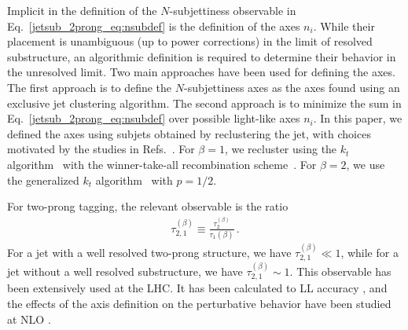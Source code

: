 \documentclass[11pt]{cernrep}
\begin{document}
Implicit in the definition of the $N$-subjettiness observable in
Eq.~\ref{jetsub_2prong_eq:nsubdef} is the definition of the axes $n_i$.
%
While their
placement is unambiguous (up to power corrections) in the limit of resolved substructure, an algorithmic definition is required to
determine their behavior in the unresolved limit.
%
Two main approaches
have been used for defining the axes.
%
The first approach is to define
the $N$-subjettiness axes as the axes found using an exclusive jet
clustering algorithm. The second approach is to minimize the sum in
Eq.~\ref{jetsub_2prong_eq:nsubdef} over possible light-like axes $n_i$.
%
In this paper, we defined the axes using subjets obtained by reclustering the jet, with choices motivated by the studies in Refs.~\cite{Stewart:2015waa,Dasgupta:2015lxh}.
%
For $\beta = 1$, we recluster using the $k_t$ algorithm~\cite{Catani:1993hr} with the
  winner-take-all recombination scheme~\cite{Larkoski:2014uqa}.
%
For $\beta = 2$, we use the generalized $k_t$ algorithm~\cite{Cacciari:2011ma} with $p=1/2$.

For two-prong tagging, the relevant observable is the ratio \cite{Thaler:2010tr}
\begin{align}
\tau_{2,1}^{(\beta)}\equiv \frac{\tau_{2}^{(\beta)}}{\tau_{1}{(\beta)}}\,.
\end{align}
For a jet with a well resolved two-prong structure, we have $\tau_{2,1}^{(\beta)}\ll 1$, while for a jet without a well resolved substructure, we have $\tau_{2,1}^{(\beta)}\sim 1$.
%
This observable has been extensively used at the LHC.
%
It has been calculated to LL accuracy \cite{Dasgupta:2015lxh}, and the effects of the axis definition on the perturbative behavior have been studied at NLO \cite{Larkoski:2015uaa}.
\end{document}
